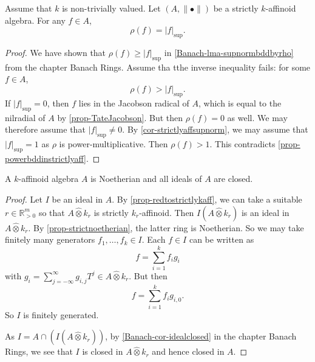 \begin{corollary}\label{cor-rhoequsup}
    Assume that $k$ is non-trivially valued.
    Let $(A,\|\bullet\|)$ be a strictly $k$-affinoid algebra. For any $f\in A$,
    \[
        \rho(f)=|f|_{\sup}.  
    \]
\end{corollary}
\begin{proof}
    We have shown that $\rho(f)\geq |f|_{\sup}$ in \cref{Banach-lma-supnormbddbyrho} from the chapter Banach Rings. 
    Assume tha tthe inverse inequality fails: for some $f\in A$,
    \[
        \rho(f)> |f|_{\sup}.
    \]
    If $|f|_{\sup}=0$, then $f$ lies in the Jacobson radical of $A$, which is equal to the nilradial of $A$ by \cref{prop-TateJacobson}. But then $\rho(f)=0$ as well. We may therefore assume that $|f|_{\sup}\neq 0$.
    By \cref{cor-strictlyaffsupnorm}, we may assume that $|f|_{\sup}=1$ as $\rho$ is power-multiplicative. Then $\rho(f)>1$. This contradicts \cref{prop-powerbddinstrictlyaff}.
\end{proof}

\begin{thm}\label{thm-affnoetherian}
A $k$-affinoid algebra $A$ is Noetherian and all ideals of $A$ are closed.  
\end{thm}
\begin{proof}
    Let $I$ be an ideal in $A$. 
    By \cref{prop-redtostrictlykaff}, we can take a suitable $r\in \mathbb{R}^m_{>0}$ so that $A\hat{\otimes} k_r$ is strictly $k_r$-affinoid. Then $I (A\hat{\otimes} k_r)$ is an ideal in $A\hat{\otimes} k_r$. By \cref{prop-strictnoetherian}, the latter ring is Noetherian. So we may take finitely many generators $f_1,\ldots,f_k\in I$. Each $f\in I$ can be written as 
    \[
        f=\sum_{i=1}^k f_i g_i  
    \]
    with $g_i=\sum_{j=-\infty}^{\infty}g_{i,j}T^j\in A\hat{\otimes} k_r$. But then 
    \[
        f=\sum_{i=1}^k f_i g_{i,0}.  
    \]
    So $I$ is finitely generated.

    As $I=A\cap (I (A\hat{\otimes} k_r))$, by \cref{Banach-cor-idealclosed} in the chapter Banach Rings, we see that $I$ is closed in $A\hat{\otimes} k_r$ and hence closed in $A$.
\end{proof}

